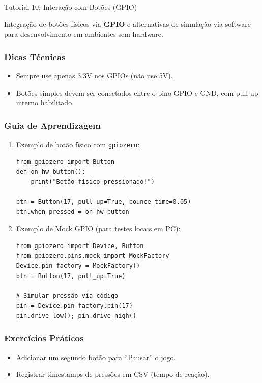 \documentclass[11pt,a4paper]{article}
\begin{document}
\newpage
\begin{boxTutorial}{Tutorial 10: Interação com Botões (GPIO)}
\label{sec:Tutorial10_Botoes}

    Integração de botões físicos via \textbf{GPIO} e alternativas de simulação via software para desenvolvimento em ambientes sem hardware.
    
    \subsubsection*{Dicas Técnicas}
    \begin{itemize}
        \item Sempre use apenas 3.3V nos GPIOs (não use 5V).
        \item Botões simples devem ser conectados entre o pino GPIO e GND, com pull-up interno habilitado.
    \end{itemize}
    
    \subsubsection*{Guia de Aprendizagem}
    \begin{enumerate}
        \item Exemplo de botão físico com \texttt{gpiozero}:
        \begin{verbatim}
from gpiozero import Button
def on_hw_button():
    print("Botão físico pressionado!")

btn = Button(17, pull_up=True, bounce_time=0.05)
btn.when_pressed = on_hw_button
        \end{verbatim}

        \item Exemplo de Mock GPIO (para testes locais em PC):
        \begin{verbatim}
from gpiozero import Device, Button
from gpiozero.pins.mock import MockFactory
Device.pin_factory = MockFactory()
btn = Button(17, pull_up=True)

# Simular pressão via código
pin = Device.pin_factory.pin(17)
pin.drive_low(); pin.drive_high()
        \end{verbatim}
    \end{enumerate}
    
    \subsubsection*{Exercícios Práticos}
    \begin{itemize}
        \item Adicionar um segundo botão para ``Pausar'' o jogo.
        \item Registrar timestamps de pressões em CSV (tempo de reação).
    \end{itemize}
\end{boxTutorial}
\end{document}
